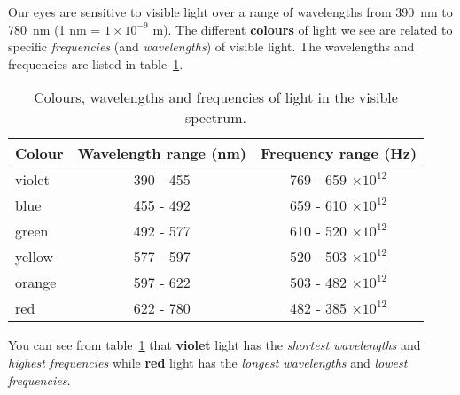 Our eyes are sensitive to visible light over a range of wavelengths from 390~nm to 780~nm (1 nm = $1 \times 10^{-9}$ m). The different \textbf{colours} of light we see are related to specific \textit{frequencies} (and \textit{wavelengths}) of visible light. The wavelengths and frequencies are listed in table~\ref{t:colour:Colours}. 

\begin{table}[H]
\begin{center}
\begin{tabular}{ | l | c | c |}
\hline
\textbf{Colour} & \textbf{Wavelength range (nm)} & \textbf{Frequency range (Hz)} \\ \hline \hline
violet & 390 - 455 & 769 - 659 $\times 10^{12}$\\ \hline
blue & 455 - 492 & 659 - 610 $\times 10^{12}$\\ \hline
green & 492 - 577  & 610 - 520 $\times 10^{12}$\\ \hline
yellow & 577 - 597 & 520 - 503 $\times 10^{12}$\\ \hline
orange & 597 - 622 & 503 - 482 $\times 10^{12}$\\ \hline
red & 622 - 780  & 482 - 385 $\times 10^{12}$\\ \hline
\hline
\end{tabular}
\end{center}
\caption{Colours, wavelengths and frequencies of light in the visible spectrum.}
\label{t:colour:Colours}
\end{table}

You can see from table~\ref{t:colour:Colours} that \textbf{violet} light has the \textit{shortest wavelengths} and \textit{highest frequencies} while \textbf{red} light has the \textit{longest wavelengths} and \textit{lowest frequencies}.



